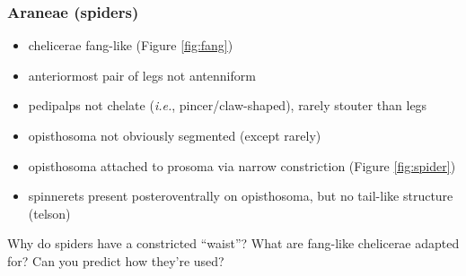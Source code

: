 \documentclass[letterpaper, 11pt]{article}
\begin{document}
\subsubsection*{Araneae (spiders)}
\begin{itemize}
\item chelicerae fang-like (Figure \ref{fig:fang})
\item anteriormost pair of legs not antenniform
\item pedipalps not chelate (\textit{i.e.}, pincer/claw-shaped), rarely stouter than legs
\item opisthosoma not obviously segmented (except rarely)
\item opisthosoma attached to prosoma via narrow constriction (Figure \ref{fig:spider})
\item spinnerets present posteroventrally on opisthosoma, but no tail-like structure (telson)
\end{itemize}
Why do spiders have a constricted ``waist''? What are fang-like chelicerae adapted for? Can you predict how they're used?\vspace{3cm}
\end{document}
